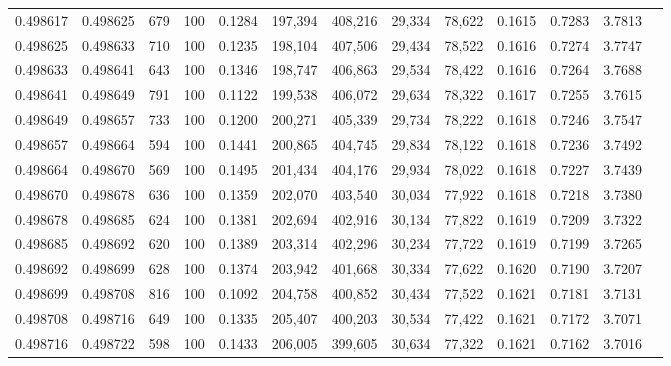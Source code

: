 \begin{tabular}{rrrrrrrrrrrrr}
0.498617 & 0.498625 &   679 & 100 &                                     0.1284 & 197,394 & 408,216 &  29,334 &  78,622 & 0.1615 & 0.7283 & 3.7813 \\
0.498625 & 0.498633 &   710 & 100 &                                     0.1235 & 198,104 & 407,506 &  29,434 &  78,522 & 0.1616 & 0.7274 & 3.7747 \\
0.498633 & 0.498641 &   643 & 100 &                                     0.1346 & 198,747 & 406,863 &  29,534 &  78,422 & 0.1616 & 0.7264 & 3.7688 \\
0.498641 & 0.498649 &   791 & 100 &                                     0.1122 & 199,538 & 406,072 &  29,634 &  78,322 & 0.1617 & 0.7255 & 3.7615 \\
0.498649 & 0.498657 &   733 & 100 &                                     0.1200 & 200,271 & 405,339 &  29,734 &  78,222 & 0.1618 & 0.7246 & 3.7547 \\
0.498657 & 0.498664 &   594 & 100 &                                     0.1441 & 200,865 & 404,745 &  29,834 &  78,122 & 0.1618 & 0.7236 & 3.7492 \\
0.498664 & 0.498670 &   569 & 100 &                                     0.1495 & 201,434 & 404,176 &  29,934 &  78,022 & 0.1618 & 0.7227 & 3.7439 \\
0.498670 & 0.498678 &   636 & 100 &                                     0.1359 & 202,070 & 403,540 &  30,034 &  77,922 & 0.1618 & 0.7218 & 3.7380 \\
0.498678 & 0.498685 &   624 & 100 &                                     0.1381 & 202,694 & 402,916 &  30,134 &  77,822 & 0.1619 & 0.7209 & 3.7322 \\
0.498685 & 0.498692 &   620 & 100 &                                     0.1389 & 203,314 & 402,296 &  30,234 &  77,722 & 0.1619 & 0.7199 & 3.7265 \\
0.498692 & 0.498699 &   628 & 100 &                                     0.1374 & 203,942 & 401,668 &  30,334 &  77,622 & 0.1620 & 0.7190 & 3.7207 \\
0.498699 & 0.498708 &   816 & 100 &                                     0.1092 & 204,758 & 400,852 &  30,434 &  77,522 & 0.1621 & 0.7181 & 3.7131 \\
0.498708 & 0.498716 &   649 & 100 &                                     0.1335 & 205,407 & 400,203 &  30,534 &  77,422 & 0.1621 & 0.7172 & 3.7071 \\
0.498716 & 0.498722 &   598 & 100 &                                     0.1433 & 206,005 & 399,605 &  30,634 &  77,322 & 0.1621 & 0.7162 & 3.7016 \\

\end{tabular}
